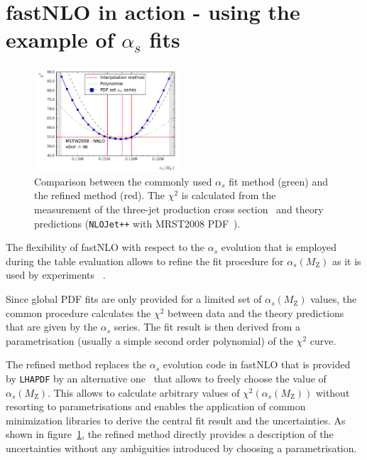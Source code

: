 \documentclass{PoS}
\begin{document}
\section{fastNLO in action - using the example of $\alpha_s$ fits}

\begin{figure}
  \centering
  \includegraphics[width=0.49\textwidth]{chi2cmp}
  \caption{Comparison between the commonly used $\alpha_s$ fit method (green)
  and the refined method (red). The $\chi^2$ is calculated from the measurement
  of the three-jet production cross section~\cite{CMS:2014mna} and theory predictions (\texttt{NLOJet++} with MRST2008 PDF~\cite{Martin:2009iq}).
  }
  \label{Fig:chi2}
\end{figure}
The flexibility of fastNLO with respect to the $\alpha_s$ evolution
that is employed during the table evaluation allows to refine the
fit procedure for $\alpha_s(M_\mathrm{Z})$ as it is used by
experiments~\cite{Affolder:2001hn,Chatrchyan:2013txa}
.%

Since global PDF fits are only provided for a limited set of
$\alpha_s(M_\mathrm{Z})$ values, the common procedure calculates the
$\chi^2$ between data and the theory predictions
that are given by the $\alpha_s$ series.
The fit result is then derived from a parametrisation (usually
a simple second order polynomial) of the $\chi^2$ curve.

The refined method replaces the
$\alpha_s$ evolution code in fastNLO that is provided by \texttt{LHAPDF} by
an alternative one~\cite{GRV} that allows to freely
choose the value of $\alpha_s(M_\mathrm{Z})$. This allows to calculate
arbitrary values of $\chi^2(\alpha_s(M_\mathrm{Z}))$ without resorting
to parametrisations and enables the application of common
minimization libraries to derive the central fit result and the
uncertainties.
As shown in figure~\ref{Fig:chi2}, the refined method directly provides
a description of the uncertainties without any ambiguities
introduced by choosing a parametrisation.




\end{document}
